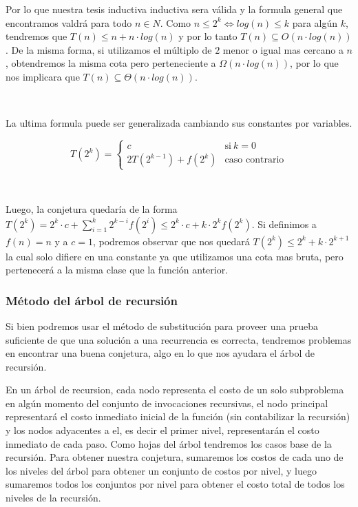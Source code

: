 Por lo que nuestra tesis inductiva inductiva sera v\'alida y la formula general que encontramos valdr\'a para todo $n \in N$. Como $n \leq 2^k \iff log(n) \leq k$ para alg\'un $k$, tendremos que $T(n) \leq n + n \cdot log(n)$ y por lo tanto $T(n) \subseteq O(n \cdot log(n))$. De la misma forma, si utilizamos el m\'ultiplo de $2$ menor o igual mas cercano a $n$, obtendremos la misma cota pero perteneciente a $\Omega(n \cdot log(n))$, por lo que nos implicara que $T(n) \subseteq \Theta(n \cdot log(n))$.

~

La ultima formula puede ser generalizada cambiando sus constantes por variables.

\begin{equation*}
  T(2^k) = \begin{cases}
	      c         		& \text{si} \ k = 0 \\
	      2T(2^{k-1}) + f(2^k)        	& \text{caso contrario}
	  \end{cases}
\end{equation*}

~

Luego, la conjetura quedar\'ia de la forma $T(2^k) = 2^k \cdot c + \sum_{i=1}^k 2^{k-i} f(2^i) \leq 2^k \cdot c + k \cdot 2^k f(2^k)$. Si definimos a $f(n) = n$ y a $c=1$, podremos observar que nos quedar\'a $T(2^k) \leq 2^k + k \cdot 2^{k+1}$ la cual solo difiere en una constante ya que utilizamos una cota mas bruta, pero pertenecer\'a a la misma clase que la funci\'on anterior.

\subsubsection{M\'etodo del \'arbol de recursi\'on}

Si bien podremos usar el m\'etodo de substituci\'on para proveer una prueba suficiente de que una soluci\'on a una recurrencia es correcta, tendremos problemas en encontrar una buena conjetura, algo en lo que nos ayudara el \'arbol de recursi\'on.

En un \'arbol de recursion, cada nodo representa el costo de un solo subproblema en alg\'un momento del conjunto de invocaciones recursivas, el nodo principal representar\'a el costo inmediato inicial de la funci\'on (sin contabilizar la recursi\'on) y los nodos adyacentes a el, es decir el primer nivel, representar\'an el costo inmediato de cada paso. Como hojas del \'arbol tendremos los casos base de la recursi\'on. Para obtener nuestra conjetura, sumaremos los costos de cada uno de los niveles del \'arbol para obtener un conjunto de costos por nivel, y luego sumaremos todos los conjuntos por nivel para obtener el costo total de todos los niveles de la recursi\'on.

